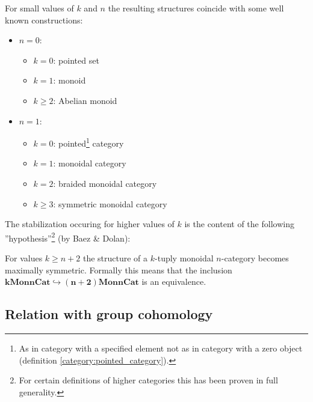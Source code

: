     \begin{example}
        For small values of $k$ and $n$ the resulting structures coincide with some well known constructions:
        \begin{itemize}
            \item $n=0$:
                \begin{itemize}
                    \item $k=0$: pointed set
                    \item $k=1$: monoid
                    \item $k\geq2$: Abelian monoid
                \end{itemize}
            \item $n=1$:
                \begin{itemize}
                    \item $k=0$: pointed\footnote{As in category with a specified element not as in category with a zero object (definition \ref{category:pointed_category}).} category
                    \item $k=1$: monoidal category
                    \item $k=2$: braided monoidal category
                    \item $k\geq3$: symmetric monoidal category
                \end{itemize}
        \end{itemize}
    \end{example}
    The stabilization occuring for higher values of $k$ is the content of the following ''hypothesis''\footnote{For certain definitions of higher categories this has been proven in full generality.} (by Baez \& Dolan):
    \begin{theorem}
        For values $k\geq n+2$ the structure of a $k$-tuply monoidal $n$-category becomes maximally symmetric. Formally this means that the inclusion \emph{$\boldsymbol{k}\textbf{Mon}\boldsymbol{n}\textbf{Cat}\hookrightarrow\boldsymbol{(n+2)}\textbf{Mon}\boldsymbol{n}\textbf{Cat}$} is an equivalence.
    \end{theorem}

\subsection[Relation to group cohomology]{Relation with group cohomology\footnotemark}

